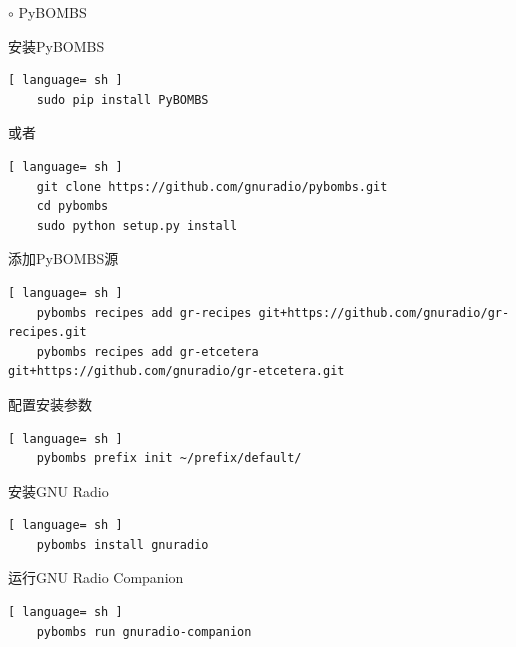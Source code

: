 			\par\noindent \qquad$\circ$ PyBOMBS
			\par 安装PyBOMBS
			\begin{lstlisting}[ language= sh ]
	sudo pip install PyBOMBS
			\end{lstlisting}
			\par 或者
			\begin{lstlisting}[ language= sh ]
	git clone https://github.com/gnuradio/pybombs.git
	cd pybombs
	sudo python setup.py install
			\end{lstlisting}
			\par 添加PyBOMBS源
			\begin{lstlisting}[ language= sh ]
	pybombs recipes add gr-recipes git+https://github.com/gnuradio/gr-recipes.git  
	pybombs recipes add gr-etcetera git+https://github.com/gnuradio/gr-etcetera.git
			\end{lstlisting}
			\par 配置安装参数
			\begin{lstlisting}[ language= sh ]
	pybombs prefix init ~/prefix/default/
			\end{lstlisting}
			\par 安装GNU Radio
			\begin{lstlisting}[ language= sh ]
	pybombs install gnuradio
			\end{lstlisting}
			\par 运行GNU Radio Companion
			\begin{lstlisting}[ language= sh ]
	pybombs run gnuradio-companion
			\end{lstlisting}
